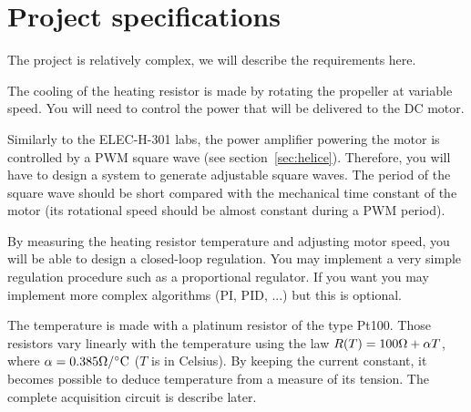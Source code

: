 \documentclass[11pt,a4paper]{article}
\theoremstyle{definition}%
\begin{document}



\section{Project specifications}
The project is relatively complex, we will describe the requirements here.

The cooling of the heating resistor is made by rotating the propeller at variable speed. 
You will need to control the power that will be delivered to the DC motor.

Similarly to the ELEC-H-301 labs, the power amplifier powering the motor is controlled by a PWM square wave (see section~\ref{sec:helice}).
Therefore, you will have to design a system to generate adjustable square waves.
The period of the square wave should be short compared with the mechanical time constant of the motor (its rotational speed should be almost constant during a PWM period).

By measuring the heating resistor temperature and adjusting motor speed, you will be able to design a closed-loop regulation.
You may implement a very simple regulation procedure such as a proportional regulator. 
If you want you may implement more complex algorithms (PI, PID, ...) but this is optional.

\begin{center}
\end{center}

The temperature is made with a platinum resistor of the type Pt100. 
Those resistors vary linearly with the temperature using the law $R(T) = 100\ohm + \alpha T$, where $\alpha = 0.385\ohm/\celsius$ ($T$ is in Celsius).
By keeping the current constant, it becomes possible to deduce temperature from a measure of its tension.
The complete acquisition circuit is describe later.

\begin{center}
\end{center}
\end{document}
